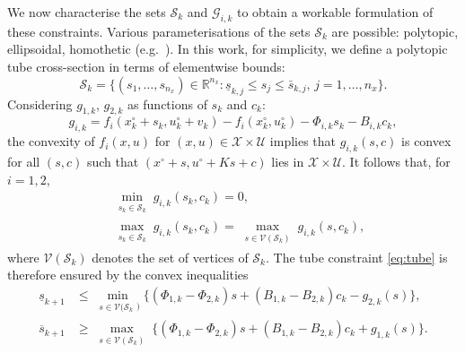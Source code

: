 \documentclass[a4paper, 10 pt, conference]{IEEEconf}
\def\RR{\mathbb{R}}
\def\G{\mathcal{G}}
\def\S{\mathcal{S}}
\def\V{\mathcal{V}}
\def\U{\mathcal{U}}
\def\X{\mathcal{X}}
\begin{document}
We now characterise the sets $\S_{k}$ and $\G_{i, k}$ to obtain a workable formulation of these constraints.
%
Various parameterisations of the sets $\S_k$ are possible: polytopic,  ellipsoidal, homothetic (e.g.~\cite{kouvaritakis}). In this work, for simplicity, we define a polytopic tube cross-section in terms of elementwise bounds:
%
\[
\S_k = \{ (s_{1}, \ldots, s_{n_x})\!\in\!\RR^{n_x} : \underline{s}_{k, j} \!\leq\! s_{j} \!\leq\! \bar{s}_{k, j},  \, j = 1, \ldots, n_x \} .
\]
Considering $g_{1,k}$, $g_{2,k}$ as functions of $s_k$ and $c_k$:
\[%
g_{i,k} \!=\! 
f_i(x^\circ_k + s_{k}, \! u^\circ_k + v_k) - f_i(x^\circ_k, \! u^\circ_k) - \Phi_{i, k} s_k - B_{i, k} c_k,  
\]%
the convexity of $f_i(x,u)$ for $(x,u)\in\X\times\U$ implies that $g_{i,k}(s,c)$ 
is convex for all $(s,c)$ such that $(x^\circ+s,u^\circ+Ks+c)$ lies in $\X\times\U$. It follows that, for $i=1,2$,
%
\begin{align*}
& \min_{\substack{s_k \in \S_k}} g_{i,k}(s_k,c_k) = 0,
\\
& \max_{\substack{s_k \in \S_k}} g_{i,k}(s_k,c_k) = \max_{\substack{s \in \V(\S_k)}} g_{i,k}(s,c_k), 
\end{align*}
%
where $\V(\S_k)$ denotes the set of vertices of $\S_k$. The tube constraint \eqref{eq:tube} is therefore ensured by the convex inequalities
%
\begin{align*}
\underline{s}_{k+1} &\leq \! \min_{\substack{s \in \V(\S_k})} \! \{(\Phi_{1, k}\!-\!\Phi_{2, k}) s + (B_{1, k}\!-\!B_{2, k}) c_k - g_{2,k}(s)\},
\\
%
\overline{s}_{k+1} &\geq \! \max_{\substack{s \in \V(\S_k)}} \! \{(\Phi_{1, k}\!-\!\Phi_{2, k}) s + (B_{1, k}\!-\!B_{2, k}) c_k + g_{1, k}(s) \}. 
\end{align*}
%
\end{document}
